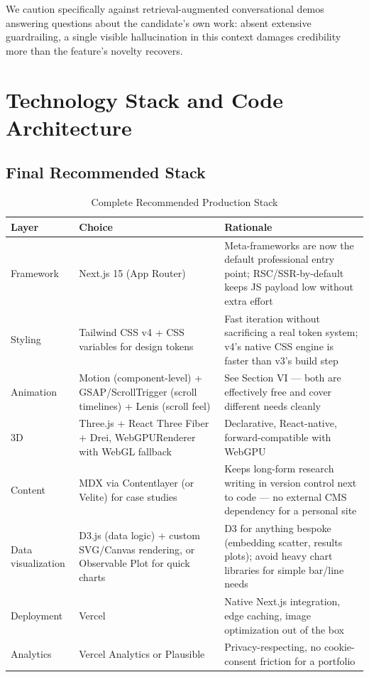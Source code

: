 \documentclass[conference]{IEEEtran}
\begin{document}
We caution specifically against retrieval-augmented conversational demos answering questions about the candidate's own work: absent extensive guardrailing, a single visible hallucination in this context damages credibility more than the feature's novelty recovers.

\section{Technology Stack and Code Architecture}

\subsection{Final Recommended Stack}
\begin{table}[t]
\centering
\caption{Complete Recommended Production Stack}
\label{tab:stack_full}
\begin{tabular}{L{2.4cm}L{3.6cm}L{9.5cm}}
\toprule
\textbf{Layer} & \textbf{Choice} & \textbf{Rationale} \\
\midrule
Framework & Next.js 15 (App Router) & Meta-frameworks are now the default professional entry point; RSC/SSR-by-default keeps JS payload low without extra effort \\
Styling & Tailwind CSS v4 + CSS variables for design tokens & Fast iteration without sacrificing a real token system; v4's native CSS engine is faster than v3's build step \\
Animation & Motion (component-level) + GSAP/ScrollTrigger (scroll timelines) + Lenis (scroll feel) & See Section VI --- both are effectively free and cover different needs cleanly \\
3D & Three.js + React Three Fiber + Drei, WebGPURenderer with WebGL fallback & Declarative, React-native, forward-compatible with WebGPU \\
Content & MDX via Contentlayer (or Velite) for case studies & Keeps long-form research writing in version control next to code --- no external CMS dependency for a personal site \\
Data visualization & D3.js (data logic) + custom SVG/Canvas rendering, or Observable Plot for quick charts & D3 for anything bespoke (embedding scatter, results plots); avoid heavy chart libraries for simple bar/line needs \\
Deployment & Vercel & Native Next.js integration, edge caching, image optimization out of the box \\
Analytics & Vercel Analytics or Plausible & Privacy-respecting, no cookie-consent friction for a portfolio \\
\bottomrule
\end{tabular}
\end{table}
\end{document}
